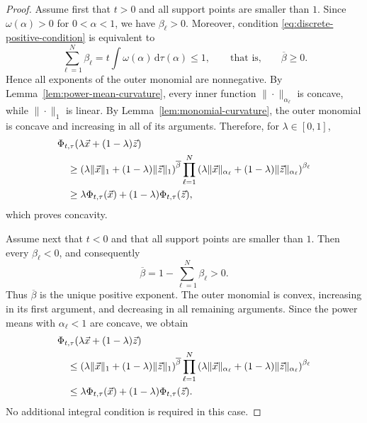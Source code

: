 \documentclass[aps,pra,11pt,onecolumn,nofootinbib,tightenlines]{revtex4-2}
\theoremstyle{definition}
\begin{document}
\begin{proof}
Assume first that $t>0$ and all support points are smaller than $1$. Since $\omega(\alpha)>0$ for $0<\alpha<1$, we have $\beta_\ell>0$. Moreover, condition \eqref{eq:discrete-positive-condition} is equivalent to
\begin{equation}
 \sum_{\ell=1}^N\beta_\ell
 =t\int\omega(\alpha)\,\mathrm d\tau(\alpha)
 \leq1,
 \qquad\text{that is,}\qquad
 \overline\beta\geq0.
 \label{eq:positive-beta-signs}
\end{equation}
Hence all exponents of the outer monomial are nonnegative. By Lemma~\ref{lem:power-mean-curvature}, every inner function $\|\cdot\|_{\alpha_\ell}$ is concave, while $\|\cdot\|_1$ is linear. By Lemma~\ref{lem:monomial-curvature}, the outer monomial is concave and increasing in all of its arguments. Therefore, for $\lambda\in[0,1]$,
\begin{align}
 &\Phi_{t,\tau}(\lambda\vec x+(1-\lambda)\vec z)\notag\\
 &\quad\geq
 \left(\lambda\|\vec x\|_1+(1-\lambda)\|\vec z\|_1\right)^{\overline\beta}
 \prod_{\ell=1}^N
 \left(
   \lambda\|\vec x\|_{\alpha_\ell}
   +(1-\lambda)\|\vec z\|_{\alpha_\ell}
 \right)^{\beta_\ell}
 \notag\\
 &\quad\geq
 \lambda\Phi_{t,\tau}(\vec x)
 +(1-\lambda)\Phi_{t,\tau}(\vec z),
 \label{eq:discrete-concavity-chain}
\end{align}
which proves concavity.

Assume next that $t<0$ and that all support points are smaller than $1$. Then every $\beta_\ell<0$, and consequently
\begin{equation}
 \overline\beta
 =1-\sum_{\ell=1}^N\beta_\ell>0.
 \label{eq:negative-below-signs}
\end{equation}
Thus $\overline\beta$ is the unique positive exponent. The outer monomial is convex, increasing in its first argument, and decreasing in all remaining arguments. Since the power means with $\alpha_\ell<1$ are concave, we obtain
\begin{align}
 &\Phi_{t,\tau}(\lambda\vec x+(1-\lambda)\vec z)\notag\\
 &\quad\leq
 \left(\lambda\|\vec x\|_1+(1-\lambda)\|\vec z\|_1\right)^{\overline\beta}
 \prod_{\ell=1}^N
 \left(
   \lambda\|\vec x\|_{\alpha_\ell}
   +(1-\lambda)\|\vec z\|_{\alpha_\ell}
 \right)^{\beta_\ell}
 \notag\\
 &\quad\leq
 \lambda\Phi_{t,\tau}(\vec x)
 +(1-\lambda)\Phi_{t,\tau}(\vec z).
 \label{eq:discrete-convexity-below-chain}
\end{align}
No additional integral condition is required in this case.


\end{proof}
\end{document}
